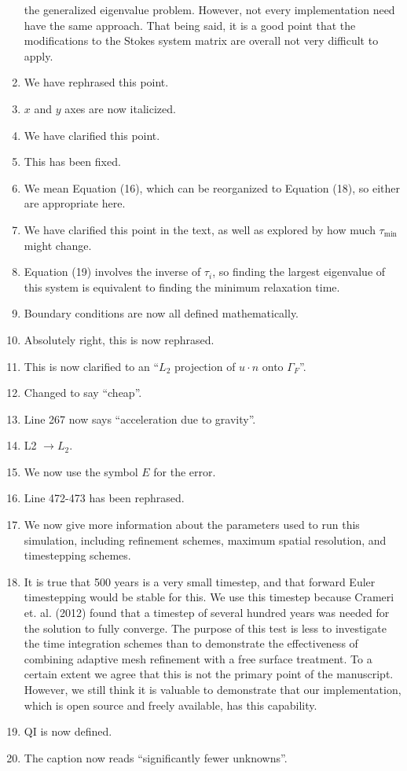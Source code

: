 \documentclass[a4paper,12pt]{article}
\begin{document}
\begin{enumerate}
    the generalized eigenvalue problem. However, not every implementation need have the same approach. That being
    said, it is a good point that the modifications to the Stokes system matrix are overall not very difficult to apply.
  \item We have rephrased this point.
  \item $x$ and $y$ axes are now italicized.
  \item We have clarified this point.
  \item This has been fixed.
  \item We mean Equation (16), which can be reorganized to Equation (18), so either are appropriate here.
  \item We have clarified this point in the text, as well as explored by how much $\tau_\mathrm{min}$ might change.
  \item Equation (19) involves the inverse of $\tau_i$, so finding the largest eigenvalue of this system
is equivalent to finding the minimum relaxation time.
  \item Boundary conditions are now all defined mathematically.
  \item Absolutely right, this is now rephrased.
  \item This is now clarified to an ``$L_2$ projection of $u \cdot n$ onto $\Gamma_F$''.
  \item Changed to say ``cheap''.
  \item Line 267 now says ``acceleration due to gravity''.
  \item L2  $\rightarrow L_2$.
  \item We now use the symbol $E$ for the error. 
  \item Line 472-473 has been rephrased.
  \item We now give more information about the parameters used to run this simulation, including refinement schemes, 
    maximum spatial resolution, and timestepping schemes.
  \item It is true that 500 years is a very small timestep, and that forward Euler timestepping would be stable for this.
We use this timestep because Crameri et. al. (2012) found that a timestep of several hundred years was needed
for the solution to fully converge. The purpose of this test is less to investigate the time integration schemes
than to demonstrate the effectiveness of combining adaptive mesh refinement with a free surface treatment.
To a certain extent we agree that this is not the primary point of the manuscript. However, we still think it
is valuable to demonstrate that our implementation, which is open source and freely available, has this capability.
  \item QI is now defined.
  \item The caption now reads ``significantly fewer unknowns''.
\end{enumerate}
\end{document}
